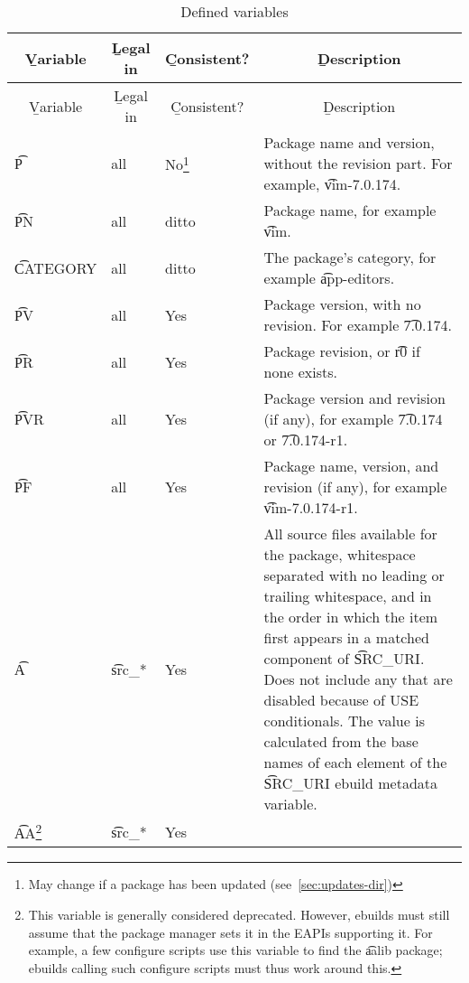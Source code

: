 \begin{landscape}
\begin{longtable}{l p{} l p{}}
\caption{Defined variables\label{tab:defined_vars}}\\
\toprule
\multicolumn{1}{c}{\b{Variable}} &
\multicolumn{1}{c}{\b{Legal in}} &
\multicolumn{1}{c}{\b{Consistent?}} &
\multicolumn{1}{c}{\b{Description}} \\
\midrule
\endfirsthead
\midrule
\multicolumn{1}{c}{\b{Variable}} &
\multicolumn{1}{c}{\b{Legal in}} &
\multicolumn{1}{c}{\b{Consistent?}} &
\multicolumn{1}{c}{\b{Description}} \\
\midrule
\endhead
\midrule
\endfoot
\bottomrule
\endlastfoot
\t{P} &
    all &
    No\footnote{May change if a package has been updated (see~\ref{sec:updates-dir})} &
    Package name and version, without the revision part. For example, \t{vim-7.0.174}. \\
\t{PN} &
    all &
    ditto &
    Package name, for example \t{vim}. \\
\t{CATEGORY} &
    all &
    ditto &
    The package's category, for example \t{app-editors}. \\
\t{PV} &
    all &
    Yes &
    Package version, with no revision. For example \t{7.0.174}. \\
\t{PR} &
    all &
    Yes &
    Package revision, or \t{r0} if none exists. \\
\t{PVR} &
    all &
    Yes &
    Package version and revision (if any), for example \t{7.0.174} or \t{7.0.174-r1}. \\
\t{PF} &
    all &
    Yes &
    Package name, version, and revision (if any), for example \t{vim-7.0.174-r1}. \\
\t{A} &
    \t{src\_*} &
    Yes &
    All source files available for the package, whitespace separated with no leading or trailing
    whitespace, and in the order in which the item first appears in a matched component of
    \t{SRC\_URI}\@. Does not include any that are disabled because of USE conditionals. The value is
    calculated from the base names of each element of the \t{SRC\_URI} ebuild metadata variable. \\
\t{AA}\footnote{This variable is generally considered deprecated. However, ebuilds must still
    assume that the package manager sets it in the EAPIs supporting it. For example, a few
    configure scripts use this variable to find the \t{aalib} package; ebuilds calling such
    configure scripts must thus work around this.} &
    \t{src\_*} &
    Yes &

\end{longtable}
\end{landscape}
